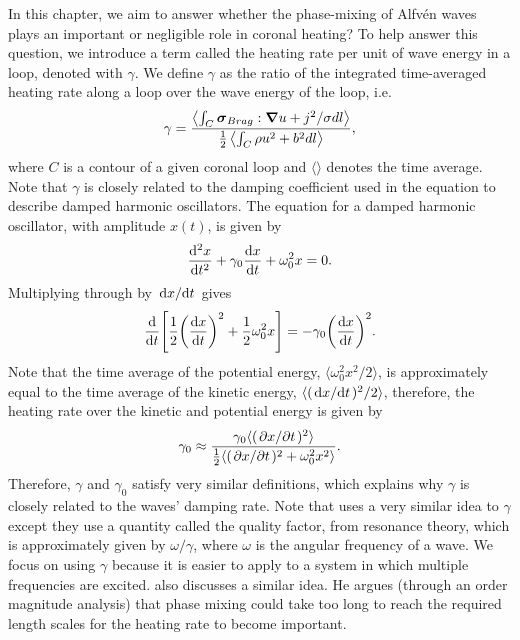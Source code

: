In this chapter, we aim to answer whether the phase-mixing of Alfv\'en waves plays an important or negligible role in coronal heating? To help answer this question, we introduce a term called the heating rate per unit of wave energy in a loop, denoted with $\gamma$. We define $\gamma$ as the ratio of the integrated time-averaged heating rate along a loop over the wave energy of the loop, i.e.
\begin{equation}
    \gamma = \frac{\left\langle\int_C \boldsymbol{\sigma}_{Brag}:\grad{u} + j^2/\sigma dl\right\rangle}{\frac{1}{2}\left\langle\int_C \rho u^2 + b^2 dl\right\rangle},
\end{equation}
where $C$ is a contour of a given coronal loop and $\langle\rangle$ denotes the time average. Note that $\gamma$ is closely related to the damping coefficient used in the equation to describe damped harmonic oscillators. The equation for a damped harmonic oscillator, with amplitude $x(t)$, is given by
\begin{equation}
    \dv[2]{x}{t}+\gamma_0\dv{x}{t}+\omega_0^2 x = 0.
\end{equation}
Multiplying through by $\dv*{x}{t}$ gives
\begin{equation}
    \dv{}{t}\qty[\frac{1}{2}\qty(\dv{x}{t})^2+\frac{1}{2}\omega_0^2 x] = -\gamma_0 \qty(\dv{x}{t})^2.
\end{equation}
Note that the time average of the potential energy, $\langle \omega_0^2 x^2 / 2 \rangle$, is approximately equal to the time average of the kinetic energy, $\langle (\dv*{x}{t})^2/2\rangle$, therefore, the heating rate over the kinetic and potential energy is given by
\begin{equation}
    \gamma_0 \approx \frac{\gamma_0\langle (\pdv*{x}{t})^2\rangle}{\frac{1}{2}\langle(\pdv*{x}{t})^2+\omega_0^2x^2\rangle}.
\end{equation}
Therefore, $\gamma$ and $\gamma_0$ satisfy very similar definitions, which explains why $\gamma$ is closely related to the waves' damping rate. Note that \citet{Hollweg1984a,Hollweg1984b} uses a very similar idea to $\gamma$ except they use a quantity called the quality factor, from resonance theory, which is approximately given by $\omega / \gamma$, where $\omega$ is the angular frequency of a wave. We focus on using $\gamma$ because it is easier to apply to a system in which multiple frequencies are excited. \citet{Arregui2015} also discusses a similar idea. He argues (through an order magnitude analysis) that phase mixing could take too long to reach the required length scales for the heating rate to become important.

